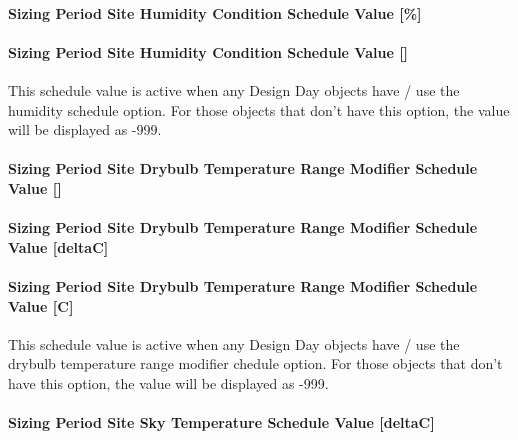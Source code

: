 \paragraph{Sizing Period Site Humidity Condition Schedule Value {[}\%{]}}\label{sizing-period-site-humidity-condition-schedule-value}

\paragraph{\texorpdfstring{Sizing Period Site Humidity Condition Schedule Value {[]}}{Sizing Period Site Humidity Condition Schedule Value }}\label{sizing-period-site-humidity-condition-schedule-value-1}

This schedule value is active when any Design Day objects have / use the humidity schedule option. For those objects that don't have this option, the value will be displayed as -999.

\paragraph{\texorpdfstring{Sizing Period Site Drybulb Temperature Range Modifier Schedule Value {[]}}{Sizing Period Site Drybulb Temperature Range Modifier Schedule Value }}\label{sizing-period-site-drybulb-temperature-range-modifier-schedule-value}

\paragraph{Sizing Period Site Drybulb Temperature Range Modifier Schedule Value {[}deltaC{]}}\label{sizing-period-site-drybulb-temperature-range-modifier-schedule-value-deltac}

\paragraph{Sizing Period Site Drybulb Temperature Range Modifier Schedule Value {[}C{]}}\label{sizing-period-site-drybulb-temperature-range-modifier-schedule-value-c}

This schedule value is active when any Design Day objects have / use the drybulb temperature range modifier chedule option. For those objects that don't have this option, the value will be displayed as -999.

\paragraph{Sizing Period Site Sky Temperature Schedule Value {[}deltaC{]}}\label{sizing-period-site-sky-temperature-schedule-value-deltac}

